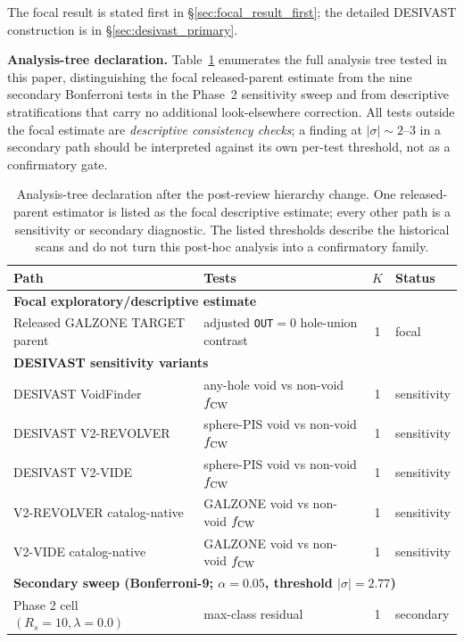 \documentclass[aps,prd,twocolumn,superscriptaddress,showpacs,preprintnumbers,nofootinbib,longbibliography,floatfix]{revtex4-2}
\begin{document}
The focal result is stated first in \S\ref{sec:focal_result_first}; the
detailed DESIVAST construction is in \S\ref{sec:desivast_primary}.
\fi

\textbf{Analysis-tree declaration.}
Table~\ref{tab:analysis_tree} enumerates the full analysis tree tested
in this paper, distinguishing the focal released-parent estimate from the
nine secondary Bonferroni tests in the Phase~2 sensitivity sweep and
from descriptive stratifications that carry no additional look-elsewhere
correction. All tests outside the focal estimate are \emph{descriptive
consistency checks}; a finding at $|\sigma| \sim 2$--$3$ in a
secondary path should be interpreted against its own per-test threshold,
not as a confirmatory gate.

\begin{table}[ht]
\caption{Analysis-tree declaration after the post-review hierarchy
change. One released-parent estimator is listed as the focal descriptive
estimate; every
other path is a sensitivity or secondary diagnostic. The listed
thresholds describe the historical scans and do not turn this post-hoc
analysis into a confirmatory family.}
\label{tab:analysis_tree}
\begin{ruledtabular}
\begin{tabular}{llcl}
Path & Tests & $K$ & Status \\
\hline
\multicolumn{4}{l}{\textbf{Focal exploratory/descriptive estimate}} \\
Released GALZONE TARGET parent & adjusted \texttt{OUT}$=0$ hole-union contrast & 1 & focal \\
\multicolumn{4}{l}{\textbf{DESIVAST sensitivity variants}} \\
DESIVAST VoidFinder & any-hole void vs non-void $f_{\rm CW}$ & 1 & sensitivity \\
DESIVAST V2-REVOLVER & sphere-PIS void vs non-void $f_{\rm CW}$ & 1 & sensitivity \\
DESIVAST V2-VIDE & sphere-PIS void vs non-void $f_{\rm CW}$ & 1 & sensitivity \\
V2-REVOLVER catalog-native & GALZONE void vs non-void $f_{\rm CW}$ & 1 & sensitivity \\
V2-VIDE catalog-native & GALZONE void vs non-void $f_{\rm CW}$ & 1 & sensitivity \\
\hline
\multicolumn{4}{l}{\textbf{Secondary sweep (Bonferroni-9; $\alpha=0.05$, threshold $|\sigma|=2.77$)}} \\
Phase 2 cell $(R_s=10,\lambda=0.0)$ & max-class residual & 1 & secondary \\

\end{tabular}
\end{ruledtabular}
\end{table}
\end{document}
